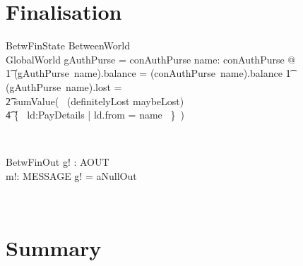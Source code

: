 \section{Finalisation}\label{ch6.final}

\begin{LSDef}
\begin{schema}{BetwFinState}
  BetweenWorld
  \\    GlobalWorld
  \where
  \dom gAuthPurse = \dom conAuthPurse
  \also
  \forall name: \dom conAuthPurse @ \\
  \t1             (gAuthPurse~name).balance = (conAuthPurse~name).balance
  \also
  \t1             \land (gAuthPurse~name).lost =
  \\ \t2                        sumValue(~ (definitelyLost \cup maybeLost)
  \\ \t4                          {} \cap \{~ ld:PayDetails | ld.from = name ~\}~)
\end{schema}~\end{LSDef}

\begin{LSDef}
\begin{schema}{BetwFinOut}
  g! : AOUT
  \\      m!: MESSAGE
  \where
  g! = aNullOut
\end{schema}~\end{LSDef}

\newpage
\section{Summary}\label{ch6.summary}

\ldefsummary %
\lthmsummary %
\lthmaddeddefsummary %
\lthmaddedthmsummary %
\lzevessummary %
